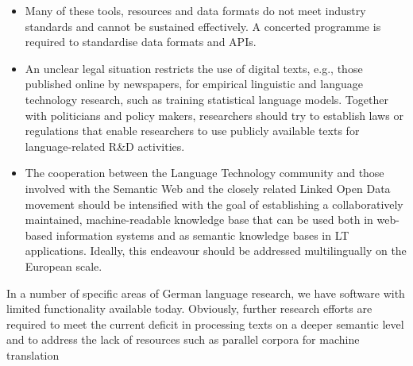 \documentclass[]{../../metanetpaper}
\begin{document}
\begin{Parallel}[c]{79mm}{78mm}
{\begin{itemize}
      \item Many of these tools, resources and data formats do not meet industry standards and cannot be sustained effectively. A concerted programme is required to standardise data formats and APIs.
      \item An unclear legal situation restricts the use of digital texts, e.g., those published online by newspapers, for empirical linguistic and language technology research, such as training statistical language models. Together with politicians and policy makers, researchers should try to establish laws or regulations that enable researchers to use publicly available texts for language-related R\&D activities.
      \item The cooperation between the Language Technology community and those involved with the Semantic Web and the closely related Linked Open Data movement should be intensified with the goal of establishing a collaboratively maintained, machine-readable knowledge base that can be used both in web-based information systems and as semantic knowledge bases in LT applications. Ideally, this endeavour should be addressed multilingually on the European scale.
    \end{itemize}
    In a number of specific areas of German language research, we have software with limited functionality available today. Obviously, further research efforts are required to meet the current deficit in processing texts on a deeper semantic level and to address the lack of resources such as parallel corpora for machine translation
  }
  
  \ParallelPar



\end{Parallel}
\end{document}
